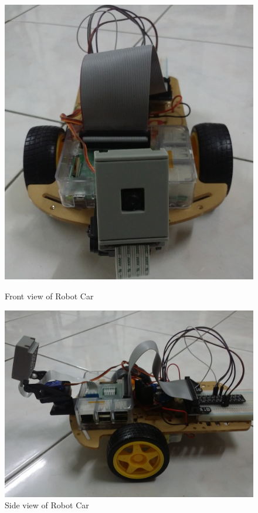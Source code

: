 \documentclass[sigconf]{acmart}
\begin{document}
\begin{figure}[htb]
  \includegraphics[width=0.8\columnwidth]{images/RobotCar_FrontView.jpg}
  \caption{Front view of Robot Car}\label{F:robotfront}

  \includegraphics[width=0.8\columnwidth]{images/RobotCar_SideView.jpg}
  \caption{Side view of Robot Car}\label{F:robotside}


\end{figure}
\end{document}
